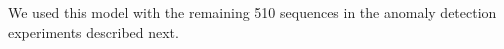 \DIFaddend We used this model with the
remaining 510 sequences in the anomaly detection experiments described
next.

\begin{figure}[t]
    \centering
    \DIFdelbeginFL %
\DIFdelendFL \DIFaddbeginFL {}
    \DIFaddendFL \\

\end{figure}
